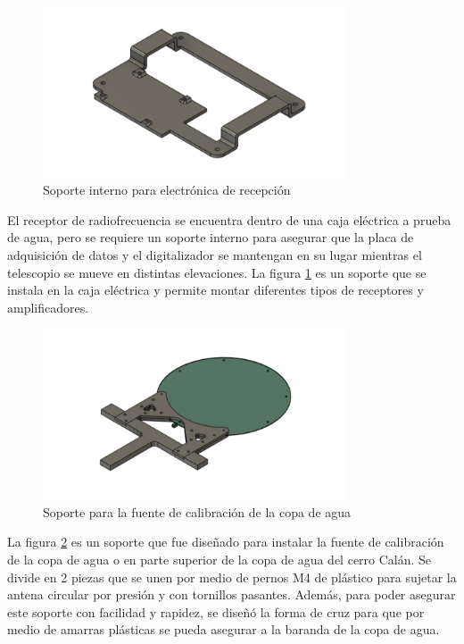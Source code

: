 \begin{figure}
    \centering
    \includegraphics[width=0.8\textwidth]{img/soporte3D7}
    \caption{Soporte interno para electrónica de recepción}
    \label{fig:ensamble6}
\end{figure}

El receptor de radiofrecuencia se encuentra dentro de una caja eléctrica a prueba de agua, pero se requiere un soporte interno para asegurar que la placa de adquisición de datos y el digitalizador se mantengan en su lugar mientras el telescopio se mueve en distintas elevaciones. La figura \ref{fig:ensamble6} es un soporte que se instala en la caja eléctrica y permite montar diferentes tipos de receptores y amplificadores.\\

\begin{figure}
    \centering
    \includegraphics[width=0.8\textwidth]{img/soporte3D4}
    \caption{Soporte para la fuente de calibración de la copa de agua }
    \label{fig:ensamble7}
\end{figure}

La figura \ref{fig:ensamble7} es un soporte que fue diseñado para instalar la fuente de calibración de la copa de agua o  en parte superior de la copa de agua del cerro Calán. Se divide en 2 piezas que se unen por medio de pernos M4 de plástico para sujetar la antena circular por presión y con tornillos pasantes. Además, para poder asegurar este soporte con facilidad y rapidez, se diseñó la forma de cruz para que por medio de amarras plásticas se pueda asegurar a la baranda de la copa de agua.\\

